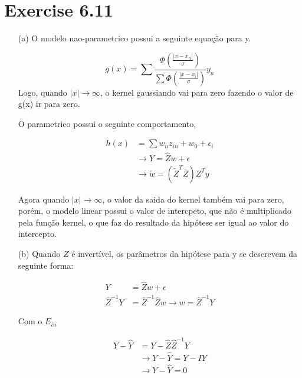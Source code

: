 \documentclass{article}
\begin{document}


\section*{Exercise 6.11}

\begin{itemize}
\item[(a)] O modelo nao-parametrico possui a seguinte equação para y.

\begin{equation}
g(x)=\sum\frac{\Phi(\frac{|x-x_{n}|}{\sigma})}{\sum\Phi(\frac{|x-x_{i}|}{\sigma})}y_{n}
\end{equation}
Logo, quando $|x| \to \infty$, o kernel gaussiando vai para zero fazendo o valor de g(x) ir para zero.


O parametrico possui o seguinte comportamento,

\begin{align*}
h(x)&=\sum w_{n}z_{in}+w_{0}+\epsilon_{i} \\
&\rightarrow Y=\hat{Z}w+\epsilon \\
&\to \tilde{w}=(\tilde{Z}^{T}\overline{Z})Z^{T}y
\end{align*}

Agora quando $|x| \to \infty$, o valor da saida do kernel também vai para zero, porém, o modelo linear possui o valor de intercpeto, que não é multiplicado pela função kernel, o que faz do resultado da hipótese ser igual ao valor do intercepto.

\item[(b)] Quando $Z$ é invertível, os parâmetros da hipótese para y se descrevem da seguinte forma:

\begin{align*}
Y&=\hat{Z}w+\epsilon \\
\hat{Z}^{-1}Y&=\hat{Z}^{-1}\hat{Z}w\rightarrow w=\hat{Z}^{-1}Y
\end{align*}

Com o  $E_{in}$ 

\begin{align*}
Y-\hat{Y}&=Y-\hat{Z}\hat{Z}^{-1}Y\\ 
&\rightarrow Y-\hat{Y}=Y-IY \\ 
&\rightarrow Y-\hat{Y}=0
\end{align*}

\end{itemize}
\end{document}
